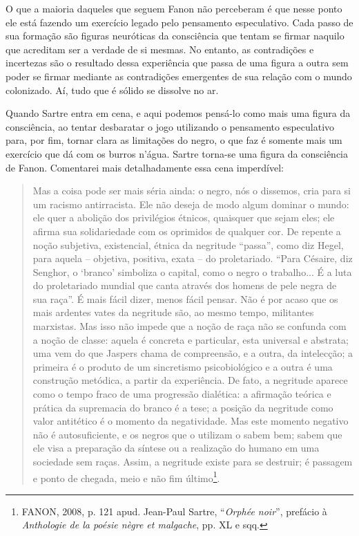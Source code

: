 O que a maioria daqueles que seguem Fanon não perceberam é que nesse
ponto ele está fazendo um exercício legado pelo pensamento especulativo.
Cada passo de sua formação são figuras neuróticas da consciência que
tentam se firmar naquilo que acreditam ser a verdade de si mesmas. No
entanto, as contradições e incertezas são o resultado dessa experiência
que passa de uma figura a outra sem poder se firmar mediante as
contradições emergentes de sua relação com o mundo colonizado. Aí, tudo
que é sólido se dissolve no ar.

Quando Sartre entra em cena, e aqui podemos pensá-lo como mais uma
figura da consciência, ao tentar desbaratar o jogo utilizando o
pensamento especulativo para, por fim, tornar clara as limitações do
negro, o que faz é somente mais um exercício que dá com os burros
n'água. Sartre torna-se uma figura da consciência de Fanon. Comentarei
mais detalhadamente essa cena imperdível:

\begin{quote}
Mas a coisa pode ser mais séria ainda: o negro, nós o dissemos, cria
para si um racismo antirracista. Ele não deseja de modo algum dominar o
mundo: ele quer a abolição dos privilégios étnicos, quaisquer que sejam
eles; ele afirma sua solidariedade com os oprimidos de qualquer cor. De
repente a noção subjetiva, existencial, étnica da negritude ``passa'',
como diz Hegel, para aquela -- objetiva, positiva, exata -- do
proletariado. ``Para Césaire, diz Senghor, o `branco' simboliza o
capital, como o negro o trabalho... É a luta do proletariado mundial que
canta através dos homens de pele negra de sua raça''. É mais fácil
dizer, menos fácil pensar. Não é por acaso que os mais ardentes vates da
negritude são, ao mesmo tempo, militantes marxistas. Mas isso não impede
que a noção de raça não se confunda com a noção de classe: aquela é
concreta e particular, esta universal e abstrata; uma vem do que Jaspers
chama de compreensão, e a outra, da intelecção; a primeira é o produto
de um sincretismo psicobiológico e a outra é uma construção metódica, a
partir da experiência. De fato, a negritude aparece como o tempo fraco
de uma progressão dialética: a afirmação teórica e prática da supremacia
do branco é a tese; a posição da negritude como valor antitético é o
momento da negatividade. Mas este momento negativo não é autosuficiente,
e os negros que o utilizam o sabem bem; sabem que ele visa a preparação
da síntese ou a realização do humano em uma sociedade sem raças. Assim,
a negritude existe para se destruir; é passagem e ponto de chegada, meio
e não fim último\footnote{FANON, 2008, p. 121 apud. Jean-Paul Sartre,
  ``\emph{Orphée noir}'', prefácio à \emph{Anthologie de la poésie nègre
  et malgache}, pp. XL e sqq.}.
\end{quote}

